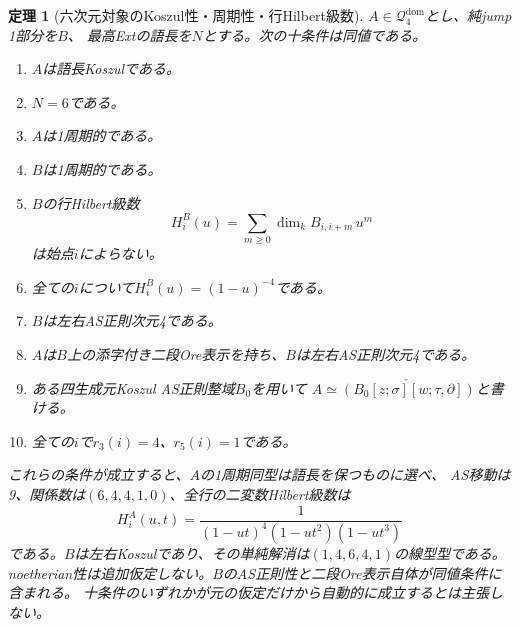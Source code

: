 \documentclass[11pt,a4paper]{ltjsarticle}
\newtheorem{theorem}{定理}[section]
\theoremstyle{definition}
\begin{document}
\begin{theorem}[六次元対象のKoszul性・周期性・行Hilbert級数]
\label{n4:thm:equivalent-criteria}
$A\in\mathcal Q_4^{\mathrm{dom}}$とし、純jump 1部分を$B$、
最高Extの語長を$N$とする。次の十条件は同値である。
\begin{enumerate}
\item $A$は語長Koszulである。
\item $N=6$である。
\item $A$は1周期的である。
\item $B$は1周期的である。
\item $B$の行Hilbert級数
\[
H_i^B(u)=\sum_{m\ge0}\dim_k B_{i,i+m}\,u^m
\]
は始点$i$によらない。
\item 全ての$i$について$H_i^B(u)=(1-u)^{-4}$である。
\item $B$は左右AS正則次元4である。
\item $A$は$B$上の添字付き二段Ore表示を持ち、$B$は左右AS正則次元4である。
\item ある四生成元Koszul AS正則整域$B_0$を用いて
$A\simeq\check{(B_0[z;\sigma][w;\tau,\partial])}$と書ける。
\item 全ての$i$で$r_3(i)=4$、$r_5(i)=1$である。
\end{enumerate}
これらの条件が成立すると、$A$の1周期同型は語長を保つものに選べ、
AS移動は9、関係数は$(6,4,4,1,0)$、全行の二変数Hilbert級数は
\[
H_i^A(u,t)=\frac1{(1-ut)^4(1-ut^2)(1-ut^3)}
\]
である。$B$は左右Koszulであり、その単純解消は$(1,4,6,4,1)$の線型型である。
noetherian性は追加仮定しない。$B$のAS正則性と二段Ore表示自体が同値条件に含まれる。
十条件のいずれかが元の仮定だけから自動的に成立するとは主張しない。
\end{theorem}
\end{document}
